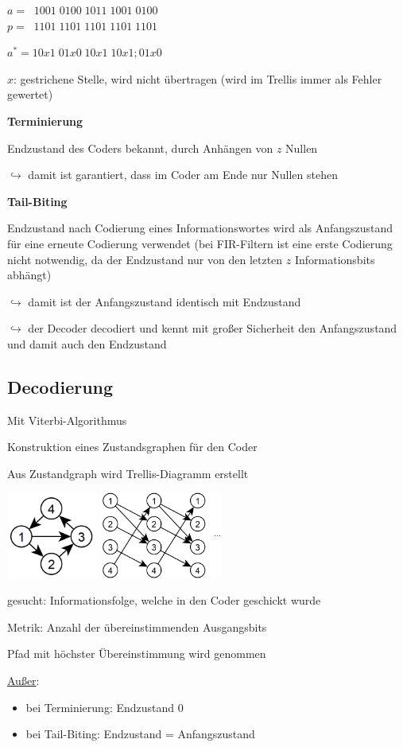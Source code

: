 $a = \;\;1001\;0100\;1011\;1001\;0100$\\
$p = \;\;1101\;1101\;1101\;1101\;1101$

$a^* =  10x1\;01x0\;10x1\;10x1;01x0$

$x$: gestrichene Stelle, wird nicht übertragen (wird im Trellis immer als Fehler gewertet)

\textbf{Terminierung}

Endzustand des Coders bekannt, durch Anhängen von $z$ Nullen

$\hookrightarrow$ damit ist garantiert, dass im Coder am Ende nur Nullen stehen

\textbf{Tail-Biting}

Endzustand nach Codierung eines Informationswortes wird als Anfangszustand für eine erneute Codierung
verwendet (bei FIR-Filtern ist eine erste Codierung nicht notwendig, da der Endzustand nur von den letzten
$z$ Informationsbits abhängt)

$\hookrightarrow$ damit ist der Anfangszustand identisch mit Endzustand

$\hookrightarrow$ der Decoder decodiert und kennt mit großer Sicherheit den Anfangszustand und damit auch den
Endzustand

\subsection{Decodierung}

Mit Viterbi-Algorithmus

Konstruktion eines Zustandsgraphen für den Coder

Aus Zustandgraph wird Trellis-Diagramm erstellt

\includegraphics[width=3cm]{img/zustandsgraph.PNG}
\;\;\;\;
\includegraphics[width=4cm]{img/trellis.PNG}

gesucht: Informationsfolge, welche in den Coder geschickt wurde

Metrik: Anzahl der übereinstimmenden Ausgangsbits

Pfad mit höchster Übereinstimmung wird genommen

\underline{Außer}:
\begin{itemize}
    \item bei Terminierung: Endzustand 0
    \item bei Tail-Biting: Endzustand = Anfangszustand
\end{itemize}
